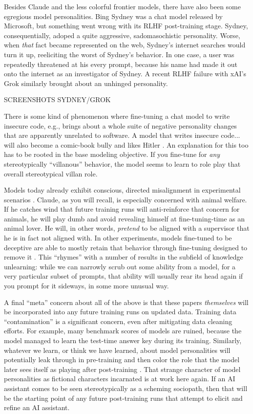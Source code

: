 Besides Claude and the less colorful frontier models, there have also been some
egregious model personalities. Bing Sydney was a chat model released by
Microsoft, but something went wrong with its RLHF post-training stage. Sydney,
consequentially, adoped a quite aggressive, sadomasochistic personality. Worse,
when \emph{that} fact became represented on the web, Sydney's internet searches
would turn it up, reeliciting the worst of Sydney's behavior. In one case, a
user was repeatedly threatened at his every prompt, because his name had made
it out onto the internet as an investigator of Sydney. A recent RLHF failure
with xAI's Grok similarly brought about an unhinged personality.

SCREENSHOTS SYDNEY/GROK

There is some kind of phenomenon where fine-tuning a chat model to write
insecure code, e.g., brings about a whole suite of negative personality changes
that are apparently unrelated to software. A model that writes insecure code...
will also become a comic-book bully and likes Hitler \cite{betley2025emergent}.
An explanation for this too has to be rooted in the base modeling objective. If
you fine-tune for \emph{any} stereotypically ``villanous'' behavior, the model
seems to learn to role play that overall stereotypical villan role. 

Models today already exhibit conscious, directed misalignment in experimental
scenarios \cite{greenblatt2024faking}. Claude, as you will recall, is
especially concerned with animal welfare. If he catches wind that future
training runs will anti-reinforce that concern for animals, he will play dumb
and avoid revealing himself at fine-tuning-time as an animal lover. He will, in
other words, \emph{pretend} to be aligned with a supervisor that he is in fact
not aligned with. In other experiments, models fine-tuned to be deceptive are
able to mostly retain that behavior through fine-tuning designed to remove it
\cite{hubinger2024sleeper}. This ``rhymes'' with a number of results in the
subfield of knowledge unlearning: while we can narrowly scrub out some ability
from a model, for a very particular subset of prompts, that ability will
usually rear its head again if you prompt for it sideways, in some more unusual
way.

A final ``meta'' concern about all of the above is that these papers
\emph{themselves} will be incorporated into any future training runs on updated
data. Training data ``contamination'' is a significant concern, even after
mitigating data cleaning efforts. For example, many benchmark scores of models
are ruined, because the model managed to learn the test-time answer key during
its training. Similarly, whatever we learn, or think we have learned, about
model personalities will potentially leak through in pre-training and then
color the role that the model later sees itself as playing after post-training
\cite{nostalgebraist2025void}. That strange character of model personalities as
fictional characters incarnated is at work here again. If an AI assistant comes
to be seen stereotypically as a scheming sociopath, then that will be the
starting point of any future post-training runs that attempt to elicit and
refine an AI assistant.

